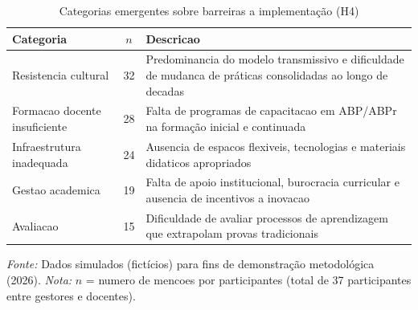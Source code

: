 \begin{table}[htbp]
    \centering
    \caption{Categorias emergentes sobre barreiras a implementação (H4)}
    \label{tab:resultado_h4}
    \small
    \begin{tabular}{p{4cm}cp{7cm}}
        \toprule
        \textbf{Categoria} & \textbf{$n$} & \textbf{Descricao} \\
        \midrule
        Resistencia cultural & 32 & Predominancia do modelo transmissivo e dificuldade de mudanca de práticas consolidadas ao longo de decadas \\
        \addlinespace
        Formacao docente insuficiente & 28 & Falta de programas de capacitacao em ABP/ABPr na formação inicial e continuada \\
        \addlinespace
        Infraestrutura inadequada & 24 & Ausencia de espacos flexiveis, tecnologias e materiais didaticos apropriados \\
        \addlinespace
        Gestao academica & 19 & Falta de apoio institucional, burocracia curricular e ausencia de incentivos a inovacao \\
        \addlinespace
        Avaliacao & 15 & Dificuldade de avaliar processos de aprendizagem que extrapolam provas tradicionais \\
        \bottomrule
    \end{tabular}
    \par\medskip
    \footnotesize{\textit{Fonte:} Dados simulados (fictícios) para fins de demonstração metodológica (2026). \textit{Nota:} $n$ = numero de mencoes por participantes (total de 37 participantes entre gestores e docentes).}
\end{table}

